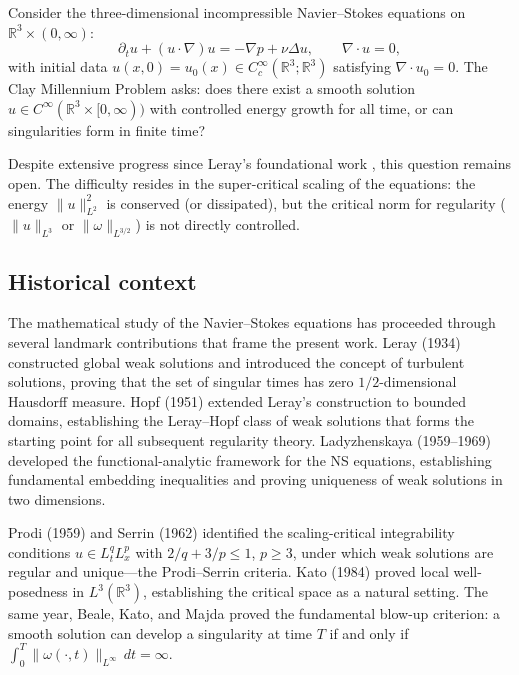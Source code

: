 \documentclass[11pt]{article}
\theoremstyle{definition}
\theoremstyle{remark}
\newcommand{\R}{\mathbb{R}}
\begin{document}
Consider the three-dimensional incompressible Navier--Stokes equations on
$\R^3 \times (0,\infty)$:
\begin{equation}\label{eq:NS}
  \partial_t u + (u \cdot \nabla) u = -\nabla p + \nu \Delta u, \qquad
  \nabla \cdot u = 0,
\end{equation}
with initial data $u(x,0) = u_0(x) \in C_c^\infty(\R^3; \R^3)$ satisfying
$\nabla \cdot u_0 = 0$.  The Clay Millennium Problem asks: does there exist a
smooth solution $u \in C^\infty(\R^3 \times [0,\infty))$ with controlled energy
growth for all time, or can singularities form in finite time?

Despite extensive progress since Leray's foundational work \cite{Leray}, this
question remains open.  The difficulty resides in the super-critical scaling of the
equations: the energy $\|u\|_{L^2}^2$ is conserved (or dissipated), but the
critical norm for regularity ($\|u\|_{L^3}$ or $\|\omega\|_{L^{3/2}}$) is not
directly controlled.

\subsection{Historical context}

The mathematical study of the Navier--Stokes equations has proceeded through
several landmark contributions that frame the present work.  Leray \cite{Leray}
(1934) constructed global weak solutions and introduced the concept of turbulent
solutions, proving that the set of singular times has zero $1/2$-dimensional
Hausdorff measure.  Hopf \cite{Hopf} (1951) extended Leray's construction to
bounded domains, establishing the Leray--Hopf class of weak solutions that forms
the starting point for all subsequent regularity theory.  Ladyzhenskaya
\cite{Ladyzhenskaya} (1959--1969) developed the functional-analytic framework for
the NS equations, establishing fundamental embedding inequalities and proving
uniqueness of weak solutions in two dimensions.

Prodi \cite{ProdiSerrin} (1959) and Serrin \cite{Serrin} (1962) identified the
scaling-critical integrability conditions $u \in L^q_t L^p_x$ with
$2/q + 3/p \leq 1$, $p \geq 3$, under which weak solutions are regular and
unique---the Prodi--Serrin criteria.  Kato \cite{Kato} (1984) proved local
well-posedness in $L^3(\R^3)$, establishing the critical space as a natural
setting.  The same year, Beale, Kato, and Majda \cite{BKM} proved the
fundamental blow-up criterion: a smooth solution can develop a singularity at
time $T$ if and only if $\int_0^T \|\omega(\cdot,t)\|_{L^\infty}\, dt = \infty$.
\end{document}
